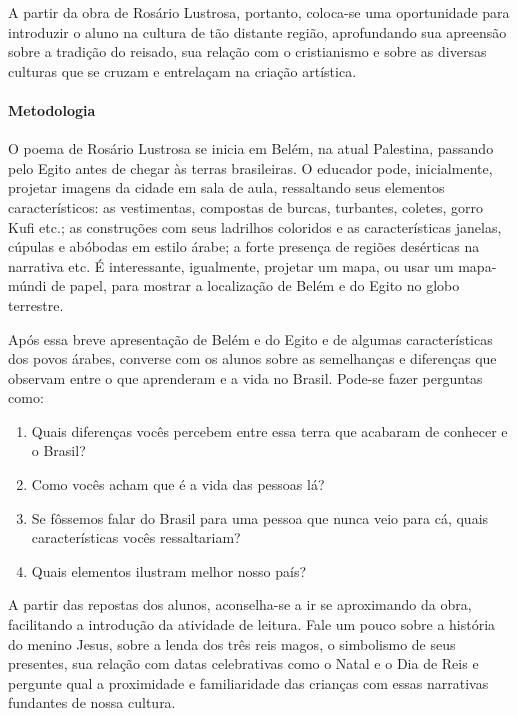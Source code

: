 \documentclass[11pt]{extarticle}
\begin{document}
A partir da obra de Rosário Lustrosa, portanto, coloca-se uma oportunidade para introduzir o aluno na cultura de tão distante região, aprofundando sua apreensão sobre a tradição do reisado, sua relação com o cristianismo e sobre as diversas culturas que se cruzam e entrelaçam na criação artística.

\paragraph{Metodologia} O poema de Rosário Lustrosa se inicia em Belém, na atual Palestina, passando pelo Egito antes de chegar às terras brasileiras. O educador pode, inicialmente, projetar imagens da cidade em sala de aula, ressaltando seus elementos característicos: as vestimentas, compostas de burcas, turbantes, coletes, gorro Kufi etc.; as construções com seus ladrilhos coloridos e as características janelas, cúpulas e abóbodas em estilo árabe; a forte presença de regiões desérticas na narrativa etc. É interessante, igualmente, projetar um mapa, ou usar um mapa-múndi de papel, para mostrar a localização de Belém e do Egito no globo terrestre. 

Após essa breve apresentação de Belém e do Egito e de algumas características dos povos árabes, converse com os alunos sobre as semelhanças e diferenças que observam entre o que aprenderam e a vida no Brasil. 
Pode-se fazer perguntas como:

\begin{enumerate}
\item Quais diferenças vocês percebem entre essa terra que acabaram de conhecer e o Brasil?

\item Como vocês acham que é a vida das pessoas lá? 

\item Se fôssemos falar do Brasil para uma pessoa que nunca veio para cá, quais características vocês ressaltariam?

\item Quais elementos ilustram melhor nosso país?

\end{enumerate}

A partir das repostas dos alunos, aconselha-se a ir se aproximando da obra, facilitando a introdução da atividade de leitura. Fale um pouco sobre a história do menino Jesus, sobre a lenda dos três reis magos, o simbolismo de seus presentes, sua relação com datas celebrativas como o Natal e o Dia de Reis e pergunte qual a proximidade e familiaridade das crianças com essas narrativas fundantes de nossa cultura.
\end{document}
